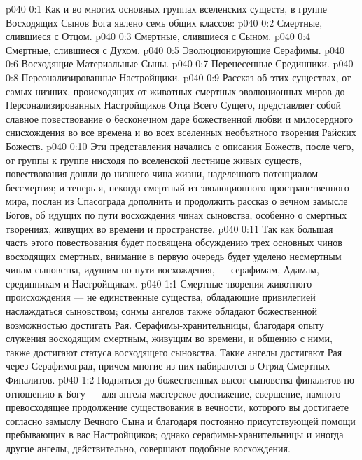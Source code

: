 \author{Могучий Вестник}
\vs p040 0:1 Как и во многих основных группах вселенских существ, в группе Восходящих Сынов Бога явлено семь общих классов:
\vs p040 0:2 \bibnobreakspace Смертные, слившиеся с Отцом.
\vs p040 0:3 \bibnobreakspace Смертные, слившиеся с Сыном.
\vs p040 0:4 \bibnobreakspace Смертные, слившиеся с Духом.
\vs p040 0:5 \bibnobreakspace Эволюционирующие Серафимы.
\vs p040 0:6 \bibnobreakspace Восходящие Материальные Сыны.
\vs p040 0:7 \bibnobreakspace Перенесенные Срединники.
\vs p040 0:8 \bibnobreakspace Персонализированные Настройщики.
\vs p040 0:9 \pc Рассказ об этих существах, от самых низших, происходящих от животных смертных эволюционных миров до Персонализированных Настройщиков Отца Всего Сущего, представляет собой славное повествование о бесконечном даре божественной любви и милосердного снисхождения во все времена и во всех вселенных необъятного творения Райских Божеств.
\vs p040 0:10 Эти представления начались с описания Божеств, после чего, от группы к группе нисходя по вселенской лестнице живых существ, повествования дошли до низшего чина жизни, наделенного потенциалом бессмертия; и теперь я, некогда смертный из эволюционного пространственного мира, послан из Спасограда дополнить и продолжить рассказ о вечном замысле Богов, об идущих по пути восхождения чинах сыновства, особенно о смертных творениях, живущих во времени и пространстве.
\vs p040 0:11 Так как большая часть этого повествования будет посвящена обсуждению трех основных чинов восходящих смертных, внимание в первую очередь будет уделено несмертным чинам сыновства, идущим по пути восхождения, --- серафимам, Адамам, срединникам и Настройщикам.
\vs p040 1:1 Смертные творения животного происхождения --- не единственные существа, обладающие привилегией наслаждаться сыновством; сонмы ангелов также обладают божественной возможностью достигать Рая. Серафимы\hyp{}хранительницы, благодаря опыту служения восходящим смертным, живущим во времени, и общению с ними, также достигают статуса восходящего сыновства. Такие ангелы достигают Рая через Серафимоград, причем многие из них набираются в Отряд Смертных Финалитов.
\vs p040 1:2 Подняться до божественных высот сыновства финалитов по отношению к Богу --- для ангела мастерское достижение, свершение, намного превосходящее продолжение существования в вечности, которого вы достигаете согласно замыслу Вечного Сына и благодаря постоянно присутствующей помощи пребывающих в вас Настройщиков; однако серафимы\hyp{}хранительницы и иногда другие ангелы, действительно, совершают подобные восхождения.
